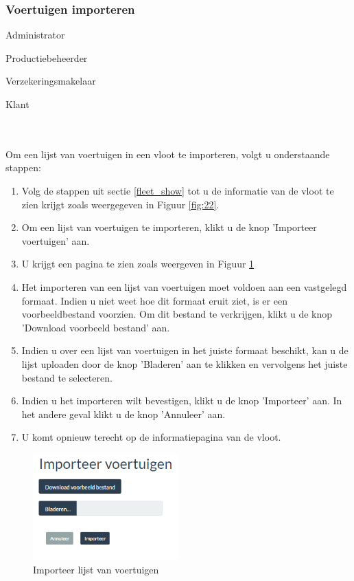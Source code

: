 \documentclass[11pt,openany]{article}
\newcommand{\cmark}{\ding{51}}%
\newcommand{\xmark}{\ding{55}}%
\newcommand{\done}{\rlap{$\square$}{\raisebox{2pt}{\large\hspace{1pt}\cmark}}%
	\hspace{-2.5pt}}
\newcommand{\wontfix}{\rlap{$\square$}{\large\hspace{1pt}\xmark}}
\begin{document}
\subsubsection{Voertuigen importeren}
\begin{todolist}
	\item[\done] Administrator
	\item[\done] Productiebeheerder
	\item[\done] Verzekeringsmakelaar
	\item[\wontfix] Klant 
\end{todolist}
\\
\\
Om een lijst van voertuigen in een vloot te importeren, volgt u onderstaande stappen:
\begin{enumerate}
	\item  Volg de stappen uit sectie \ref{fleet_show} tot u de informatie van de vloot te zien krijgt zoals weergegeven in Figuur \ref{fig:22}.
	\item Om een lijst van voertuigen te importeren, klikt u de knop 'Importeer voertuigen' aan.
	\item U krijgt een pagina te zien zoals weergeven in Figuur \ref{fig:25}
	\item Het importeren van een lijst van voertuigen moet voldoen aan een vastgelegd formaat. Indien u niet weet hoe dit formaat eruit ziet, is er een voorbeeldbestand voorzien. Om dit bestand te verkrijgen, klikt u de knop 'Download voorbeeld bestand' aan.
	\item Indien u over een lijst van voertuigen in het juiste formaat beschikt, kan u de lijst uploaden door de knop 'Bladeren' aan te klikken en vervolgens het juiste bestand te selecteren.
	\item Indien u het importeren wilt bevestigen, klikt u de knop 'Importeer' aan. In het andere geval klikt u de knop 'Annuleer' aan.
	\item U komt opnieuw terecht op de informatiepagina van de vloot.
\end{enumerate}

\begin{figure}
	\centering
	\includegraphics[width=0.5\textwidth]{img/fig25.png}
	\caption{Importeer lijst van voertuigen} 
	\label{fig:25} 
\end{figure}
\newpage
\end{document}
